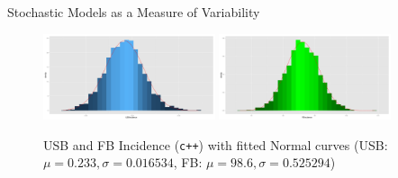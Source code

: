 \documentclass[final]{beamer}
\begin{document}
\begin{frame}
\begin{columns}[T]
\begin{column}{.3\textwidth}
      \vspace{.33em}
      \begin{block}{Stochastic Models as a Measure of Variability}
        \begin{figure}[h]
          \begin{center}
            \includegraphics[width=0.45\textwidth]{IN0dist}
            \hspace{0.8em}
            \includegraphics[width=0.45\textwidth]{IN1dist}
          \end{center}
          \caption{USB and FB Incidence (\texttt{c++}) with fitted Normal curves (USB: $\mu = 0.233, \sigma = 0.016534$, FB: $\mu = 98.6, \sigma = 0.525294$)}
          \label{fig:INdist}
        \end{figure}
      \end{block}
      

\end{column}
\end{columns}
\end{frame}
\end{document}

